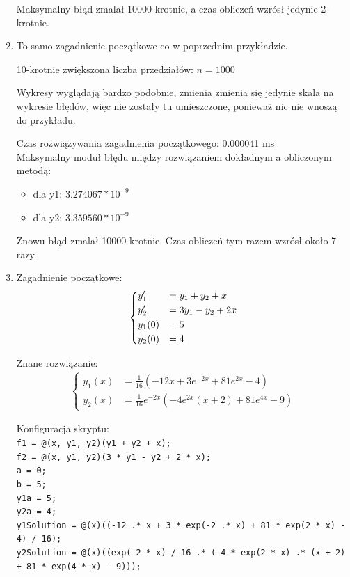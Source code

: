 \documentclass[12pt]{article}
\begin{document}
\begin{enumerate}[label=\textbf{Przykład \arabic*}]
		Maksymalny błąd zmalał 10000-krotnie, a czas obliczeń wzrósł jedynie 2-krotnie.
		
		\item
		\label{example-bigN}
		
		To samo zagadnienie początkowe co w poprzednim przykładzie.
		
		10-krotnie zwiększona liczba przedziałów: $n = 1000$
		
		Wykresy wyglądają bardzo podobnie, zmienia zmienia się jedynie skala na wykresie błędów, więc nie zostały tu umieszczone, ponieważ nic nie wnoszą do przykładu.
		
		Czas rozwiązywania zagadnienia początkowego: 0.000041 ms\\
		Maksymalny moduł błędu między rozwiązaniem dokładnym a obliczonym metodą:
		\begin{itemize}
			\item dla y1: $3.274067 * 10^{-9}$
			\item dla y2: $3.359560 * 10^{-9}$
		\end{itemize}
		
		Znowu błąd zmalał 10000-krotnie. Czas obliczeń tym razem wzrósł około 7 razy.
		
		\item
		Zagadnienie początkowe:
		\begin{align*}
		\begin{dcases}
			y_1' &= y_1 + y_2 + x \\
			y_2' &= 3y_1 - y_2 + 2x \\
			y_1(0) &= 5 \\
			y_2(0) &= 4
		\end{dcases}
		\end{align*}
		
		Znane rozwiązanie:
		\begin{align*}
		\begin{cases}
			y_1(x) &= \frac{1}{16} (-12x + 3e^{-2x} + 81e^{2x} - 4) \\
			y_2(x) &= \frac{1}{16}e^{-2x}(-4e^{2x}(x + 2) + 81e^{4x} - 9)
		\end{cases}
		\end{align*}
		
		Konfiguracja skryptu: \\
		\texttt{f1 = @(x, y1, y2)(y1 + y2 + x); \\
		f2 = @(x, y1, y2)(3 * y1 - y2 + 2 * x); \\
		a = 0; \\
		b = 5; \\
		y1a = 5; \\
		y2a = 4; \\
		y1Solution = @(x)((-12 .* x + 3 * exp(-2 .* x) + 81 * exp(2 * x) - 4) / 16); \\ 
		y2Solution = @(x)((exp(-2 * x) / 16 .* (-4 * exp(2 * x) .* (x + 2) + 81 * exp(4 * x) - 9)));
		}
	

\end{enumerate}
\end{document}
